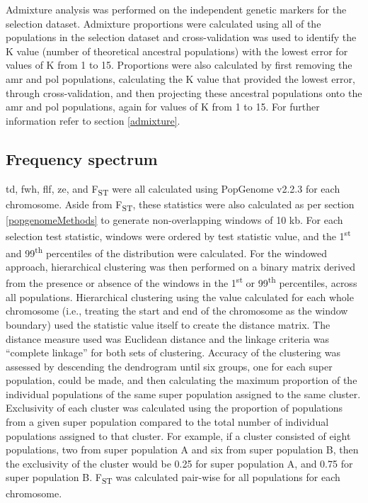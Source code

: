 \documentclass[twoside,openright]{report}
\begin{document}
Admixture analysis was performed on the independent genetic markers for
the selection dataset. Admixture proportions were calculated using all
of the populations in the selection dataset and cross-validation was
used to identify the K value (number of theoretical ancestral
populations) with the lowest error for values of K from 1 to 15.
Proportions were also calculated by first removing the \gls{amr} and
\gls{pol} populations, calculating the K value that provided the lowest
error, through cross-validation, and then projecting these ancestral
populations onto the \gls{amr} and \gls{pol} populations, again for
values of K from 1 to 15. For further information refer to section
\ref{admixture}.

\subsection{Frequency spectrum}\label{frequency-spectrum}

\Gls{td}, \gls{fwh}, \gls{flf}, \gls{ze}, and F\textsubscript{ST} were
all calculated using PopGenome v2.2.3 \citep{Pfeifer2014} for each
chromosome. Aside from F\textsubscript{ST}, these statistics were also
calculated as per section \ref{popgenomeMethods} to generate
non-overlapping windows of 10 kb. For each selection test statistic,
windows were ordered by test statistic value, and the
1\textsuperscript{st} and 99\textsuperscript{th} percentiles of the
distribution were calculated. For the windowed approach, hierarchical
clustering was then performed on a binary matrix derived from the
presence or absence of the windows in the 1\textsuperscript{st} or
99\textsuperscript{th} percentiles, across all populations. Hierarchical
clustering using the value calculated for each whole chromosome (i.e.,
treating the start and end of the chromosome as the window boundary)
used the statistic value itself to create the distance matrix. The
distance measure used was Euclidean distance and the linkage criteria
was ``complete linkage'' for both sets of clustering. Accuracy of the
clustering was assessed by descending the dendrogram until six groups,
one for each super population, could be made, and then calculating the
maximum proportion of the individual populations of the same super
population assigned to the same cluster. Exclusivity of each cluster was
calculated using the proportion of populations from a given super
population compared to the total number of individual populations
assigned to that cluster. For example, if a cluster consisted of eight
populations, two from super population A and six from super population
B, then the exclusivity of the cluster would be 0.25 for super
population A, and 0.75 for super population B. F\textsubscript{ST} was
calculated pair-wise for all populations for each chromosome.
\end{document}
